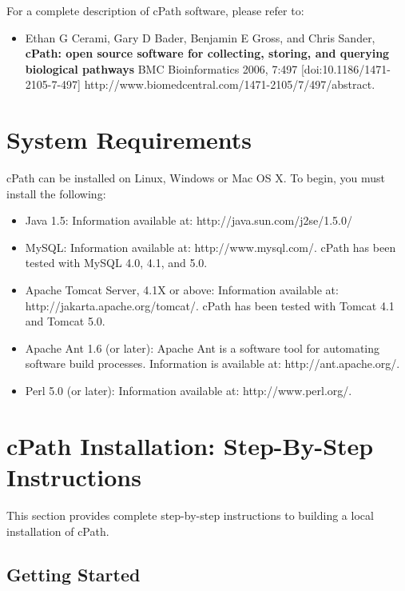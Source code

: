\documentclass[letterpaper,12pt]{article}
\begin{document}
For a complete description of cPath software, please refer to:

\begin{itemize}
\item Ethan G Cerami, Gary D Bader, Benjamin E Gross, and Chris Sander, \textbf{cPath: open source software for collecting, storing, and querying biological pathways} BMC Bioinformatics 2006, 7:497 [doi:10.1186/1471-2105-7-497]
http://www.biomedcentral.com/1471-2105/7/497/abstract.
\end{itemize}

\section{System Requirements}

cPath can be installed on Linux, Windows or Mac OS X.  To begin, you must install the following:

\begin{itemize}

\item Java 1.5:  Information available at:  http://java.sun.com/j2se/1.5.0/

\item MySQL: Information available at: http://www.mysql.com/.  cPath has been tested with MySQL 4.0, 4.1, and 5.0. 

\item Apache Tomcat Server, 4.1X or above: Information available at: \linebreak
http://jakarta.apache.org/tomcat/.  cPath has been tested with Tomcat 4.1 and Tomcat 5.0. 
 
\item Apache Ant 1.6 (or later): Apache Ant is a software tool for automating software build processes.  Information is available at: http://ant.apache.org/. 
 
\item Perl 5.0 (or later): Information available at: http://www.perl.org/. 

\end {itemize}

\section{cPath Installation:  Step-By-Step Instructions }

This section provides complete step-by-step instructions to building a local installation of cPath.

\subsection{Getting Started}
\end{document}
